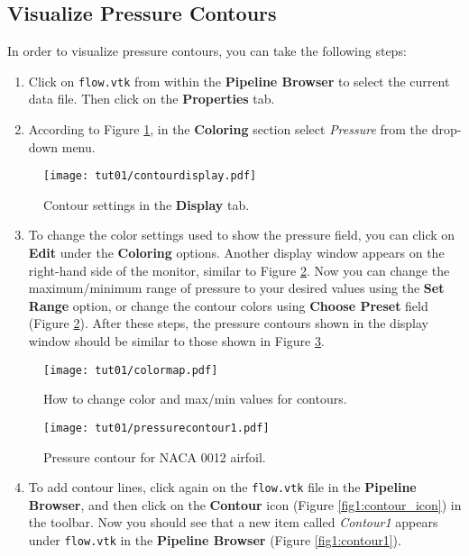 \subsection{Visualize Pressure Contours}
In order to visualize pressure contours, you can take the following steps:
\begin{enumerate}[label=\arabic*)]
    \item Click on \texttt{flow.vtk} from within the \textbf{Pipeline Browser} to select the current data file. Then click on the \textbf{Properties} tab.
    \item According to Figure \ref{fig1:colorby}, in the \textbf{Coloring} section select \textit{Pressure} from the drop-down menu.
\end{enumerate}
\begin{figure}[H]
    \centering
    \texttt{[image: tut01/contourdisplay.pdf]}
    \caption{Contour settings in the \textbf{Display} tab.}
    \label{fig1:colorby}
\end{figure}
\begin{enumerate}[label=\arabic*)]
	\setcounter{enumi}{2}
    \item To change the color settings used to show the pressure field, you can click on \textbf{Edit} under the \textbf{Coloring} options. Another display window appears on the right-hand side of the monitor, similar to Figure \ref{fig1:change_color_range}. Now you can change the maximum/minimum range of pressure to your desired values using the \textbf{Set Range} option, or change the contour colors using \textbf{Choose Preset} field (Figure \ref{fig1:change_color_range}). After these steps, the pressure contours shown in the display window should be similar to those shown in Figure \ref{fig1:pressure_contour}.
\end{enumerate}
\begin{figure}[!h]
    \centering
    \texttt{[image: tut01/colormap.pdf]}
    \caption{How to change color and max/min values for contours.}
    \label{fig1:change_color_range}
\end{figure}
\begin{figure}[!h]
    \centering
    \texttt{[image: tut01/pressurecontour1.pdf]}
    \caption{Pressure contour for NACA 0012 airfoil.}
    \label{fig1:pressure_contour}
\end{figure}
\begin{enumerate}[label=\arabic*)]
	\setcounter{enumi}{3}
	\item To add contour lines, click again on the \texttt{flow.vtk} file in the \textbf{Pipeline Browser}, and then click on the \textbf{Contour} icon (Figure \ref{fig1:contour_icon}) in the toolbar. Now you should see that a new item called \textit{Contour1} appears under \texttt{flow.vtk} in the \textbf{Pipeline Browser} (Figure \ref{fig1:contour1}).
\end{enumerate}
